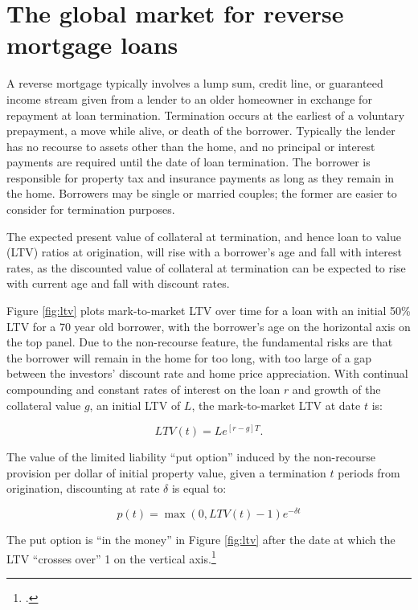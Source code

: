 \documentclass[12pt]{article}
\begin{document}
\section{\label{sec:global} The global market for reverse mortgage loans}

A reverse mortgage typically involves a lump sum, credit line, or guaranteed
income stream given from a lender to an older homeowner in exchange for
repayment at loan termination. Termination occurs at the earliest of a
voluntary prepayment, a move while alive, or death of the borrower. Typically
the lender has no recourse to assets other than the home, and no principal or
interest payments are required until the date of loan termination. The borrower
is responsible for property tax and insurance payments as long as they remain
in the home. Borrowers may be single or married couples; the former are easier
to consider for termination purposes. 

The expected present value of collateral at termination, and hence loan to
value (LTV) ratios at origination, will rise with a borrower's age and fall
with interest rates, as the discounted value of collateral at termination can
be expected to rise with current age and fall with discount rates.

Figure \ref{fig:ltv} plots mark-to-market LTV over time for a loan with an
initial 50\% LTV for a 70 year old borrower, with the borrower's age on the
horizontal axis on the top panel. Due to the non-recourse feature, the
fundamental risks are that the borrower will remain in the home for too long,
with too large of a gap between the investors' discount rate and home price
appreciation. With continual compounding and constant rates of interest on the
loan $r$ and growth of the collateral value $g$, an initial LTV of $L$, the
mark-to-market LTV at date $t$ is:

\begin{equation}
	LTV(t) = Le^{\left[r-g\right]T}.
\end{equation}

The value of the limited liability ``put option'' induced by the non-recourse
provision per dollar of initial property value, given a termination $t$ periods
from origination, discounting at rate $\delta$ is equal to:

\begin{equation}
	\label{eq:put}
	p(t) = \max\left(0,LTV(t)-1\right)e^{-\delta t}
\end{equation}

The put option is ``in the money'' in Figure \ref{fig:ltv} after the date at
which the LTV ``crosses over'' 1 on the vertical
axis.\footnote{\textcite{ChinloyMegbolugbe}.}
\end{document}
